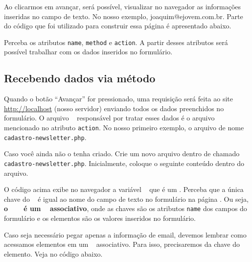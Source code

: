 
Ao clicarmos em avançar, será possível, visualizar no navegador as informações inseridas no campo
de texto. No nosso exemplo, joaquim@ejovem.com.br. Parte do código que foi utilizado para
construir essa página é apresentado abaixo.



Perceba os atributos \texttt{name}, \texttt{method} e \texttt{action}. A partir desses
atributos será possível trabalhar com os dados inseridos no formulário.

\subsection{Recebendo dados via método \metodoGET}
\label{recebendo-dados-via-metodo-get}

Quando o botão ``Avançar'' for pressionado, uma requisição será feita ao site 
\url{http://localhost} (nosso servidor) enviando todos os dados preenchidos no
formulário. O arquivo \phpextensao~ responsável por tratar esses dados é o arquivo
mencionado no atributo \texttt{action}. No nosso primeiro exemplo, o arquivo de nome
\texttt{cadastro-newsletter.php}.

Caso você ainda não o tenha criado. Crie um novo arquivo dentro de 
chamado \texttt{cadastro-newsletter.php}. Inicialmente, coloque o seguinte conteúdo dentro do arquivo.



O código acima exibe no navegador a variável \variavelget~ que é um \tipoarray. Perceba que a
única chave do \tipoarray~ é igual ao nome do campo de texto no formulário na página \html.
Ou seja, \textbf{o \tipoarray~ \variavelget~ é um \tipoarray~ associativo}, onde as chaves são
os atributos \texttt{name} dos campos do formulário e os elementos são os valores inseridos
no formulário.


Caso seja necessário pegar apenas a informação de email, devemos lembrar como acessamos 
elementos em um \tipoarray~ associativo. Para isso, precisaremos da chave do elemento. Veja
no código abaixo.



